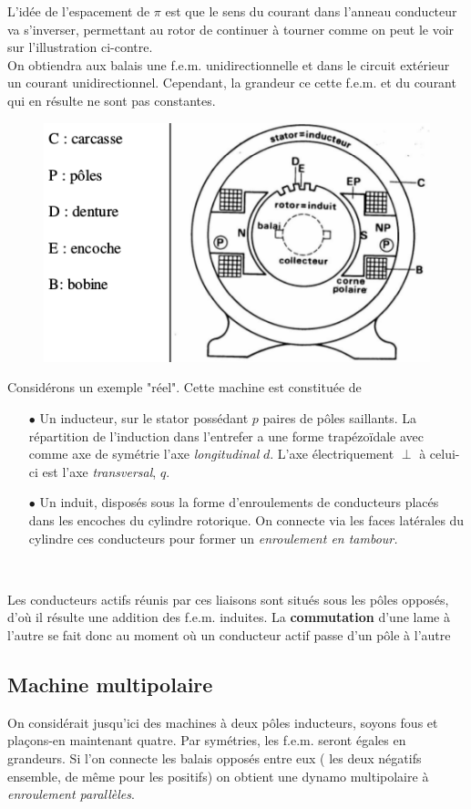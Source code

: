 	L'idée de l'espacement de $\pi$ est que le sens du courant dans 
	l'anneau conducteur va s'inverser, permettant au rotor de continuer 
	à tourner comme on peut le voir sur l'illustration ci-contre.\\
	On obtiendra aux balais une f.e.m. unidirectionnelle et dans le circuit 
	extérieur un courant unidirectionnel. Cependant, la grandeur ce cette 
	f.e.m. et du courant qui en résulte ne sont pas constantes.
	
	\newpage
	\begin{figure}
	\includegraphics[scale=0.4]{ch4/image2.png}
	\end{figure}
	Considérons un exemple "réel". Cette machine est constituée de 
	\begin{itemize}
	\item[$\bullet$] Un inducteur, sur le stator possédant $p$ paires de 
	pôles saillants. La répartition de l'induction dans l'entrefer a une 
	forme trapézoïdale avec comme axe de symétrie l'axe \textit{longitudinal} 
	$d$. L'axe électriquement $\perp$ à celui-ci est l'axe \textit{transversal},
	$q$.
	\item[$\bullet$] 	Un induit, disposés sous la forme d'enroulements de 
	conducteurs placés dans les encoches du cylindre rotorique. On connecte 
	via les faces latérales du cylindre ces conducteurs pour former un 
	\textit{enroulement en tambour.} 
	\end{itemize}\ 
	
	Les conducteurs actifs réunis par ces liaisons sont situés sous les 
	pôles opposés, d’où il résulte une addition des f.e.m. induites.
	La \textbf{commutation} d’une lame à l’autre se fait donc au moment 
	où un conducteur actif passe d’un pôle à l’autre
	
	
	\subsection{Machine multipolaire}
	On considérait jusqu'ici des machines à deux pôles inducteurs, soyons 
	fous et plaçons-en maintenant quatre. Par symétries, les f.e.m. seront 
	égales en grandeurs. Si l'on connecte les balais opposés entre eux (
	les deux négatifs ensemble, de même pour les positifs) on obtient une 
	dynamo multipolaire à \textit{enroulement parallèles}.
	
